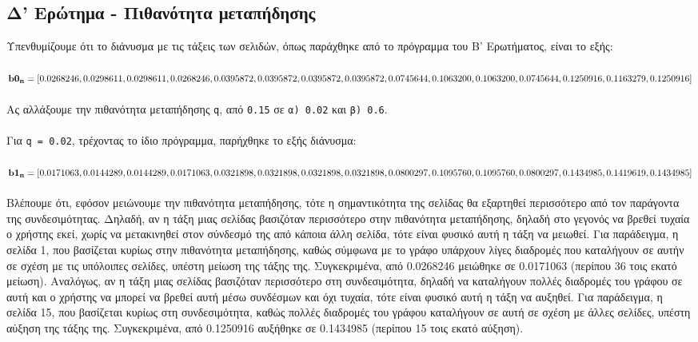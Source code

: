 \documentclass[a4paper, 14pt]{article}   %
\begin{document}
\subsection*{Δ' Ερώτημα - Πιθανότητα μεταπήδησης}  %
Υπενθυμίζουμε ότι το διάνυσμα με τις τάξεις των σελιδών, όπως παράχθηκε από το πρόγραμμα του Β' Ερωτήματος, είναι το εξής:\\\\
$\mathbf{b0_n} = [0.0268246, 0.0298611, 0.0298611, 0.0268246, 0.0395872, 0.0395872, 0.0395872,\\ 0.0395872, 0.0745644, 0.1063200, 0.1063200, 0.0745644, 0.1250916, 0.1163279,  0.1250916]$\\\\
Ας αλλάξουμε την πιθανότητα μεταπήδησης \texttt{q}, από \texttt{0.15} σε \texttt{α) 0.02} και \texttt{β) 0.6}.\\\\
Για \texttt{q = 0.02}, τρέχοντας το ίδιο πρόγραμμα, παρήχθηκε το εξής διάνυσμα:\\\\
$\mathbf{b1_n} = [0.0171063, 0.0144289, 0.0144289, 0.0171063, 0.0321898, 0.0321898, 0.0321898,\\ 0.0321898, 0.0800297, 0.1095760, 0.1095760, 0.0800297, 0.1434985, 0.1419619, 0.1434985]$\\\\
Βλέπουμε ότι, εφόσον μειώνουμε την πιθανότητα μεταπήδησης, τότε η σημαντικότητα της σελίδας θα εξαρτηθεί περισσότερο από τον παράγοντα της συνδεσιμότητας. Δηλαδή, αν η τάξη μιας σελίδας βασιζόταν περισσότερο στην πιθανότητα μεταπήδησης, δηλαδή στο γεγονός να βρεθεί τυχαία ο χρήστης εκεί, χωρίς να μετακινηθεί στον σύνδεσμό της από κάποια άλλη σελίδα, τότε είναι φυσικό αυτή η τάξη να μειωθεί. Για παράδειγμα, η σελίδα 1, που βασίζεται κυρίως στην πιθανότητα μεταπήδησης, καθώς σύμφωνα με το γράφο υπάρχουν λίγες διαδρομές που καταλήγουν σε αυτήν σε σχέση με τις υπόλοιπες σελίδες, υπέστη μείωση της τάξης της. Συγκεκριμένα, από 0.0268246 μειώθηκε σε 0.0171063 (περίπου 36 τοις εκατό μείωση). Αναλόγως, αν η τάξη μιας σελίδας βασιζόταν περισσότερο στη συνδεσιμότητα, δηλαδή να καταλήγουν πολλές διαδρομές του γράφου σε αυτή και ο χρήστης να μπορεί να βρεθεί αυτή μέσω συνδέσμων και όχι τυχαία, τότε είναι φυσικό αυτή η τάξη να αυξηθεί. Για παράδειγμα, η σελίδα 15, που βασίζεται κυρίως στη συνδεσιμότητα, καθώς πολλές διαδρομές του γράφου καταλήγουν σε αυτή σε σχέση με άλλες σελίδες, υπέστη αύξηση της τάξης της. Συγκεκριμένα, από 0.1250916 αυξήθηκε σε 0.1434985 (περίπου 15 τοις εκατό αύξηση).\\\\
\end{document}
